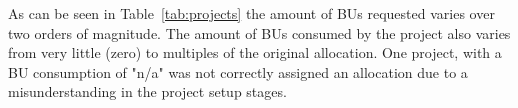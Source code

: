 As can be seen in Table~\ref{tab:projects} the amount of BUs requested varies over two orders of magnitude.
The amount of BUs consumed by the project also varies from very little (zero) to multiples of the original allocation.
One project, with a BU consumption of "n/a" was not correctly assigned an allocation due to a misunderstanding in the project setup stages.

